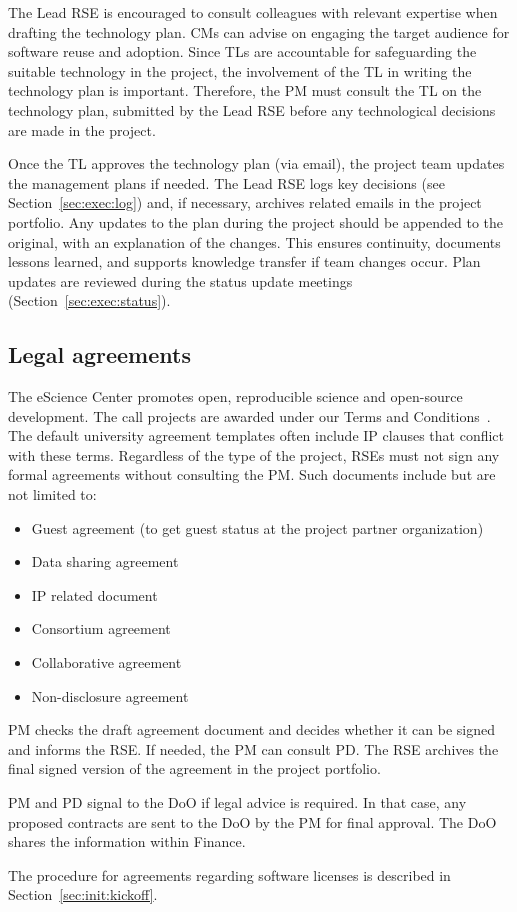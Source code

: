 The Lead RSE is encouraged to consult colleagues with relevant expertise when drafting the technology plan. CMs can advise 
on engaging the target audience for software reuse and adoption. Since TLs are accountable for safeguarding the suitable technology in the project, the involvement of the
TL in writing the technology plan is important. Therefore, the PM must consult the TL on the technology plan, submitted
by the Lead RSE before any technological decisions are made in the project.

Once the TL approves the technology plan (via email), the project team updates the management plans if needed. The Lead 
RSE logs key decisions (see Section~\ref{sec:exec:log}) and, if necessary, archives related emails in the project portfolio. 
Any updates to the plan during the project should be appended to the original, with an explanation of the changes. 
This ensures continuity, documents lessons learned, and supports knowledge transfer if team changes occur. Plan updates are reviewed during the status update meetings (Section~\ref{sec:exec:status}).

\subsection{Legal agreements}
\label{sec:init:legal}
The eScience Center promotes open, reproducible science and open-source development. The call projects are awarded under our Terms and Conditions~\cite{nlesc-terms}. 
The default university agreement templates often include IP clauses that conflict with these terms. 
% 
Regardless of the type of the project, RSEs must not sign any formal agreements without consulting the PM. Such
documents include but are not limited to:
\begin{itemize}
\item Guest agreement (to get guest status at the project partner organization)
\item Data sharing agreement
\item IP related document
\item Consortium agreement
\item Collaborative agreement
\item Non-disclosure agreement
\end{itemize}

PM checks the draft agreement document and decides whether it can be signed and informs the RSE. If needed, the PM can
consult PD. The RSE archives the final signed version of the agreement in the project portfolio.

PM and PD signal to the DoO if legal advice is required. In that case, any proposed contracts are sent to the DoO by the
PM for final approval. The DoO shares the information within Finance.

The procedure for agreements regarding software licenses is described in Section~\ref{sec:init:kickoff}.
